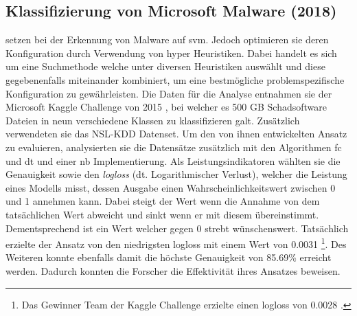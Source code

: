 \documentclass[
    12pt, %
    DIV10,
    ngerman, %
    a4paper, %
    oneside, %
    titlepage, %
    parskip=half, %
    headings=normal, %
    listof=totoc, %
    bibliography=totoc, %
    index=totoc, %
    captions=tableheading, %
    final %
]{scrreprt}
\begin{document}
\subsection{Klassifizierung von Microsoft Malware (2018)}\label{sabar}
\textcite{Sabar2018} setzen bei der Erkennung von Malware auf \ac{svm}. Jedoch optimieren sie deren Konfiguration durch Verwendung von hyper Heuristiken. Dabei handelt es sich um eine Suchmethode welche unter diversen Heuristiken auswählt und diese gegebenenfalls miteinander kombiniert, um eine bestmögliche problemspezifische Konfiguration zu gewährleisten. Die Daten für die Analyse entnahmen sie der Microsoft Kaggle Challenge von 2015 \parencite{Kaggle}, bei welcher es 500 GB Schadsoftware Dateien in neun verschiedene Klassen zu klassifizieren galt. Zusätzlich verwendeten sie das NSL-KDD Datenset. Um den von ihnen entwickelten Ansatz zu evaluieren, analysierten sie die Datensätze zusätzlich mit den Algorithmen \ac{fc} und \ac{dt} und einer \ac{nb} Implementierung. Als Leistungsindikatoren wählten sie die Genauigkeit sowie den \emph{logloss} (dt. Logarithmischer Verlust), welcher die Leistung eines Modells misst, dessen Ausgabe einen Wahrscheinlichkeitswert zwischen 0 und 1 annehmen kann. Dabei steigt der Wert wenn die Annahme von dem tatsächlichen Wert abweicht und sinkt wenn er mit diesem übereinstimmt. Dementsprechend ist ein Wert welcher gegen 0 strebt wünschenswert. Tatsächlich erzielte der Ansatz von \textcite{Sabar2018} den niedrigsten logloss mit einem Wert von 0.0031 \footnote{Das Gewinner Team der Kaggle Challenge erzielte einen logloss von 0.0028 \parencite{leader}.}. Des Weiteren konnte ebenfalls damit die höchste Genauigkeit von 85.69\% erreicht werden. Dadurch konnten die Forscher die Effektivität ihres Ansatzes beweisen.
%
\end{document}
